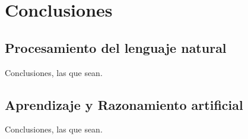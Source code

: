 \chapter{Conclusiones}
\label{chap:conclusiones}

\section{Procesamiento del lenguaje natural}
Conclusiones, las que sean.

\section{Aprendizaje y Razonamiento artificial}
Conclusiones, las que sean.

